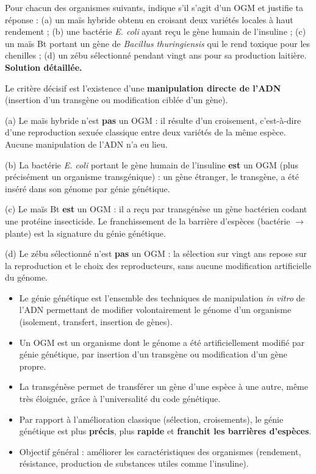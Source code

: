 \documentclass[11pt]{article}
\newcommand{\cle}[1]{{\popxbold\color{popdark}#1}}
\begin{document}
\begin{exoresolu}
Pour chacun des organismes suivants, indique s'il s'agit d'un OGM et justifie ta réponse : (a) un maïs hybride obtenu en croisant deux variétés locales à haut rendement ; (b) une bactérie \emph{E. coli} ayant reçu le gène humain de l'insuline ; (c) un maïs Bt portant un gène de \emph{Bacillus thuringiensis} qui le rend toxique pour les chenilles ; (d) un zébu sélectionné pendant vingt ans pour sa production laitière.
\tcblower
\textbf{Solution détaillée.}

Le critère décisif est l'existence d'une \textbf{manipulation directe de l'ADN} (insertion d'un transgène ou modification ciblée d'un gène).

(a) Le maïs hybride n'est \textbf{pas} un OGM : il résulte d'un croisement, c'est-à-dire d'une reproduction sexuée classique entre deux variétés de la même espèce. Aucune manipulation de l'ADN n'a eu lieu.

(b) La bactérie \emph{E. coli} portant le gène humain de l'insuline \textbf{est} un OGM (plus précisément un organisme transgénique) : un gène étranger, le transgène, a été inséré dans son génome par génie génétique.

(c) Le maïs Bt \textbf{est} un OGM : il a reçu par transgénèse un gène bactérien codant une protéine insecticide. Le franchissement de la barrière d'espèces (bactérie $\rightarrow$ plante) est la signature du génie génétique.

(d) Le zébu sélectionné n'est \textbf{pas} un OGM : la sélection sur vingt ans repose sur la reproduction et le choix des reproducteurs, sans aucune modification artificielle du génome.
\end{exoresolu}

\begin{aretenir}
\begin{itemize}
\item Le \cle{génie génétique} est l'ensemble des techniques de manipulation \emph{in vitro} de l'ADN permettant de modifier volontairement le génome d'un organisme (isolement, transfert, insertion de gènes).
\item Un \cle{OGM} est un organisme dont le génome a été artificiellement modifié par génie génétique, par insertion d'un transgène ou modification d'un gène propre.
\item La \cle{transgénèse} permet de transférer un gène d'une espèce à une autre, même très éloignée, grâce à l'universalité du code génétique.
\item Par rapport à l'amélioration classique (sélection, croisements), le génie génétique est plus \textbf{précis}, plus \textbf{rapide} et \textbf{franchit les barrières d'espèces}.
\item Objectif général : améliorer les caractéristiques des organismes (rendement, résistance, production de substances utiles comme l'insuline).
\end{itemize}
\end{aretenir}
\end{document}
